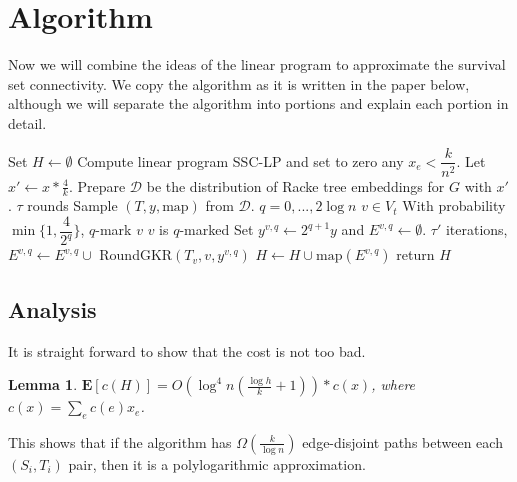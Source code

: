 \documentclass[12pt]{article}
\newtheorem{lemma}{Lemma}
\begin{document}
\section{Algorithm}

Now we will combine the ideas of the linear program to approximate the survival set connectivity. We copy the algorithm as it is written in the paper below, although we will separate the algorithm into portions and explain each portion in detail.
\begin{codebox}
\li Set $H \leftarrow \emptyset$
\li Compute linear program SSC-LP and set to zero any $x_e < \dfrac{k}{n^2}$.
\li Let $x' \leftarrow x*\frac{4}{k}$. 
\li Prepare $\mathcal{D}$ be the distribution of Racke tree embeddings for $G$ with $x'$.
\li \For $\tau$ rounds \Do
\li Sample $(T, y, \text{map})$ from $\mathcal{D}$. 
\li \For $q = 0, ..., 2\log n$ \Do
\li \For $v \in V_t$ \Do
\li With probability $\min\{1, \dfrac{4}{2^q}\}$, $q$-mark $v$
\li \If $v$ is $q$-marked \Then
\li Set $y^{v, q}\leftarrow 2^{q+1}y$ and $E^{v,q} \leftarrow \emptyset$.
\li \For $\tau'$ iterations, \Do
\li $E^{v,q} \leftarrow E^{v,q} \cup$ RoundGKR$(T_v, v, y^{v,q})$ \End
\li $H \leftarrow H \cup \text{map}(E^{v,q})$ \End \End \End \End
\li return $H$
\end{codebox}

\subsection{Analysis}

It is straight forward to show that the cost is not too bad.

\begin{lemma}
$\textbf{E}[c(H)] = O(\log^4n(\frac{\log h}{k}+1)) * c(x)$, where $c(x) = \sum_e c(e)x_e$. 
\end{lemma}
This shows that if the algorithm has $\Omega(\frac{k}{\log n})$ edge-disjoint paths between each $(S_i, T_i)$ pair, then it is a polylogarithmic approximation. 
\end{document}
